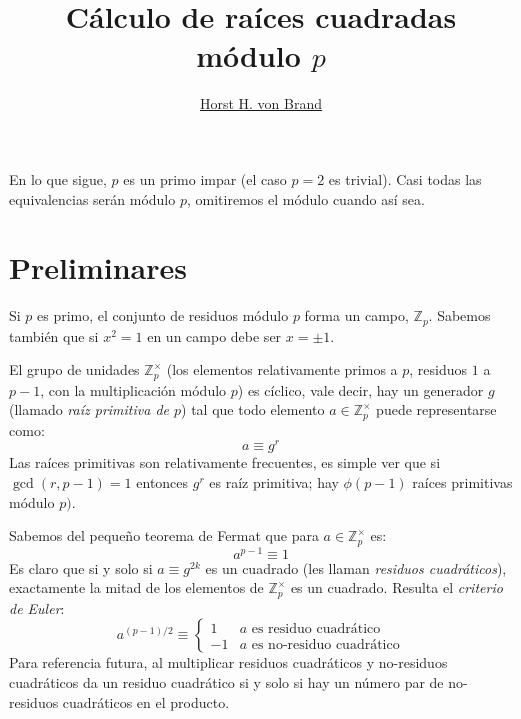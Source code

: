 \documentclass[english, german, spanish, fleqn]{article}
\title{Cálculo de raíces cuadradas módulo \(p\)}
\author{\href{mailto:vonbrand@inf.utfsm.cl}{Horst H. von Brand}}
\begin{document}


\maketitle
\thispagestyle{empty}

  En lo que sigue,
  \(p\) es un primo impar
  (el caso  \(p = 2\) es trivial).
  Casi todas las equivalencias serán módulo \(p\),
  omitiremos el módulo cuando así sea.

\section{Preliminares}
\label{sec:preliminares}

  Si \(p\) es primo,
  el conjunto de residuos módulo \(p\) forma un campo,
  \(\mathbb{Z}_p\).
  Sabemos también que si \(x^2 = 1\) en un campo debe ser \(x = \pm 1\).

  El grupo de unidades \(\mathbb{Z}_p^\times\)
  (los elementos relativamente primos a \(p\),
   residuos \(1\) a \(p - 1\),
   con la multiplicación módulo \(p\))
  es cíclico,
  vale decir,
  hay un generador \(g\)
  (llamado \emph{raíz primitiva de \(p\)})
  tal que todo elemento \(a \in \mathbb{Z}_p^\times\) puede representarse como:
  \begin{equation}
    \label{eq:units-powers}
    a
      \equiv g^r
  \end{equation}
  Las raíces primitivas son relativamente frecuentes,
  es simple ver que si \(\gcd(r, p - 1) = 1\)
  entonces \(g^r\) es raíz primitiva;
  hay \(\phi(p - 1)\) raíces primitivas módulo \(p)\).

  Sabemos del pequeño teorema de Fermat que para \(a \in \mathbb{Z}_p^\times\)
  es:
  \begin{equation}
    \label{eq:Fermat}
    a^{p - 1}
      \equiv 1
  \end{equation}
  Es claro que si y solo si \(a \equiv g^{2 k}\) es un cuadrado
  (les llaman \emph{residuos cuadráticos}),
  exactamente la mitad de los elementos de \(\mathbb{Z}_p^\times\)
  es un cuadrado.
  Resulta el \emph{criterio de Euler}:
  \begin{equation}
    \label{eq:Euler-criterion}
    a^{(p - 1) / 2}
      \equiv \begin{cases}
                1 & \text{\(a\) es residuo cuadrático} \\
               -1 & \text{\(a\) es no-residuo cuadrático}
             \end{cases}
  \end{equation}
  Para referencia futura,
  al multiplicar residuos cuadráticos y no\nobreakdash-residuos cuadráticos
  da un residuo cuadrático
  si y solo si hay un número par de no\nobreakdash-residuos cuadráticos
  en el producto.
\end{document}
